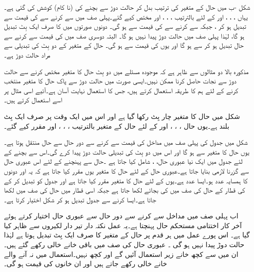 شکل   -ب میں حال کے متغیر کی ترتیب بدل کر  حالت دوڑ  سے بچنے  کی  (نا کام) کوشش کی گئی ہے۔ یہاں ، ، ، اور  کے لئے بالترتیب ، ، ، اور  مختص کیے گئے۔پہلی صف  میں   سے    کرنے سے  کی قیمت  سے تبدیل ہو کر  ، جبکہ  سے  کرنے سے  کی قیمت  سے  ہو گی۔  دونوں صورتوں میں  کا صرف ایک بِٹ تبدیل ہو گا، لہٰذا پہلی صف میں حالت دوڑ پیدا نہیں ہو گا۔ البتہ دوسری صف میں  کی قیمت  سے  کرنے سے حال تبدیل ہو کر  سے  ہو گا اور یوں  کی قیمت  سے  ہو گی۔ حال کے متغیر کے دو بِٹ کی تبدیلی سے مراد حالت دوڑ ہے۔

مذکورہ بالا دو مثالوں سے ظاہر ہے کہ موجودہ مسئلے میں دو بِٹ  حال کا متغیر  مختص کرنے  سے حالت دوڑ سے نجات حاصل کرنا ممکن نہیں۔ایسی صورت میں حالت دوڑ سے پاک حال کا متغیر منتخب کرنے  کے لئے ہم   کا طریقہ استعمال کرتے ہیں، جس کا استعمال  نہایت آسان ہے۔آئیے  اسی مثال پر اسے  استعمال کرتے  ہیں۔

شکل میں  حال کا متغیر چار بِٹ رکھا گیا ہے اور اس میں ایک وقت پر   صرف ایک  بِٹ بلند ہے۔یوں حال   ، ، ، اور  کے لئے حال کے متغیر  بالترتیب ، ، ، اور   مقرر کیے گئے۔


شکل    میں جدول کی پہلی صف میں  مداخل کی قیمت   سے   کرنے سے دور حال  سے حال   منتقل ہوتا ہے۔یوں حال کا متغیر   سے  ہو گا اور اس میں دو بِٹ کی تبدیلی حالت دوڑ  پیدا کرے گی۔اس سے  بچنے کے لئے جدول میں ایک نیا عبوری حال، ، شامل کیا جاتا ہے ۔حال   سے   پہنچنے کے لئے اس عبوری حال سے گزرنا  لازمی بنایا جاتا ہے۔عبوری حال     کے لئے حال کا متغیر یوں مقرر کیا جاتا ہے کہ یہ   اور  دونوں کا ہمسایہ عدد ہو۔ایسا عدد   ہے۔یوں   کے لئے  حال کا متغیر  مقرر کیا جاتا ہے اور جدول کو تبدیل کر کے  کی قطار کے حال   کی صف میں  کی بجائے  لکھا جاتا ہے جبکہ اسی قطار میں حال   کی صف میں  لکھا جاتا ہے۔ایسا کرنے سے جدول تبدیل ہو کر شکل   اختیار کرتا ہے۔


اب پہلی صف میں مداخل   سے   کرنے سے  دور حال   سے عبوری حال   اختیار کرتے ہوئے آخر کار اختتامی مستحکم  حال   پہنچتا ہے۔یہ عمل نکتہ دار تیر دار لکیروں سے  ظاہر کیا گیا ہے۔  اس پورے عمل میں  ہر قدم پر حال کے متغیر کا صرف ایک بِٹ تبدیل ہوتا ہے  لہٰذا حالت دوڑ  پیدا نہیں ہو گی ۔ عبوری حال  کی صف میں  باقی خانے خالی رکھے گئے ہیں۔ان میں سے کچھ خانے زیر استعمال آئیں گے اور کچھ نہیں۔استعمال  میں نہ آنے والے خانے خالی رکھے جاتے ہیں اور ان خانوں  کی قیمت ہو گی۔

